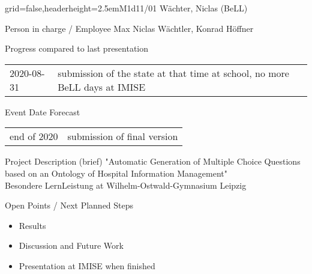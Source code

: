 \documentclass[english]{kiesgrube}
\begin{document}
\begin{poster}{grid=false,headerheight=2.5em}{}{M1d11/01 Wächter, Niclas (BeLL)}{}{}
\begin{posterbox}[name=person,column=0,row=0]{Person in charge / Employee}
Max Niclas Wächtler, Konrad Höffner
\end{posterbox}
\begin{posterbox}[name=progress,below=person]{Progress compared to last presentation}
\begin{tabulary}{\textwidth}{lL}
2020-08-31	&submission of the state at that time at school, no more BeLL days at IMISE\\
\end{tabulary}
\end{posterbox}
\begin{posterbox}[name=event,below=progress]{Event Date Forecast}
\begin{tabulary}{\textwidth}{lL}
end of 2020	&submission of final version\\
\end{tabulary}
\end{posterbox}
\begin{posterbox}[name=description,column=1,row=0]{Project Description (brief)}
\small
"Automatic Generation of Multiple Choice Questions based on an Ontology of Hospital Information Management"\\
Besondere LernLeistung at Wilhelm-Ostwald-Gymnasium Leipzig
\end{posterbox}
\begin{posterbox}[name=open,column=1,below=description]{Open Points / Next Planned Steps}
\begin{itemize}
\item Results
\item Discussion and Future Work
\item Presentation at IMISE when finished
\end{itemize}
\end{posterbox}

\end{poster}
\end{document}
